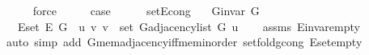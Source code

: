 \begin{isabellebody}
\ \ \ \ \isamarkupfalse%
\ force\isanewline
\ \ \isamarkupfalse%
\ \isamarkupfalse%
\ {\isacharquery}{\kern0pt}case\isanewline
\ \ \ \ \isacommand{{\isachardot}{\kern0pt}}\isamarkupfalse%
\isanewline
{}\isamarkupfalse%
%
\endisatagproof
{\isafoldproof}%
%
\isadelimproof
%
\endisadelimproof
\isanewline
%
\isadeliminvisible
\isanewline
%
\endisadeliminvisible
%
\isataginvisible
{}\isamarkupfalse%
\ set{\isacharunderscore}{\kern0pt}E{\isacharunderscore}{\kern0pt}cong{\isacharcolon}{\kern0pt}\isanewline
\ \ \ {\isachardoublequoteopen}G{\isachardot}{\kern0pt}invar\ G{\isachardoublequoteclose}\isanewline
\ \ \ {\isachardoublequoteopen}E{\isachardot}{\kern0pt}set\ {\isacharparenleft}{\kern0pt}E\ G{\isacharparenright}{\kern0pt}\ {\isacharequal}{\kern0pt}\ {\isacharbraceleft}{\kern0pt}{\isacharparenleft}{\kern0pt}u{\isacharcomma}{\kern0pt}\ v{\isacharparenright}{\kern0pt}{\isachardot}{\kern0pt}\ v\ {\isasymin}\ set\ {\isacharparenleft}{\kern0pt}G{\isachardot}{\kern0pt}adjacency{\isacharunderscore}{\kern0pt}list\ G\ u{\isacharparenright}{\kern0pt}{\isacharbraceright}{\kern0pt}{\isachardoublequoteclose}%
\endisataginvisible
{\isafoldinvisible}%
%
\isadeliminvisible
%
\endisadeliminvisible
\isanewline
%
\isadelimproof
\ \ %
\endisadelimproof
%
\isatagproof
{}\isamarkupfalse%
\ assms\ E{\isachardot}{\kern0pt}invar{\isacharunderscore}{\kern0pt}empty\isanewline
\ \ \isamarkupfalse%
\ {\isacharparenleft}{\kern0pt}auto\ simp\ add{\isacharcolon}{\kern0pt}\ G{\isachardot}{\kern0pt}mem{\isacharunderscore}{\kern0pt}adjacency{\isacharunderscore}{\kern0pt}iff{\isacharunderscore}{\kern0pt}mem{\isacharunderscore}{\kern0pt}inorder\ set{\isacharunderscore}{\kern0pt}fold{\isacharunderscore}{\kern0pt}g{\isacharunderscore}{\kern0pt}cong\ E{\isachardot}{\kern0pt}set{\isacharunderscore}{\kern0pt}empty{\isacharparenright}{\kern0pt}%
\endisatagproof
{\isafoldproof}%
%
\isadelimproof
%
\endisadelimproof
\isanewline
%
\isadeliminvisible
\isanewline
%
\endisadeliminvisible
%
\isataginvisible
{}\isamarkupfalse%
%
\endisataginvisible
{\isafoldinvisible}%
%
\isadeliminvisible
%
\endisadeliminvisible
\ \isanewline
%
\isadelimtheory
\isanewline
%
\endisadelimtheory
%
\isatagtheory
{}\isamarkupfalse%
%
\endisatagtheory
{\isafoldtheory}%
%
\isadelimtheory
%
\endisadelimtheory
%
\end{isabellebody}%
\endinput
